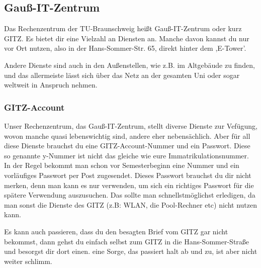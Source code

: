 \subsection{Gauß-IT-Zentrum}

	Das Rechenzentrum der TU-Braunschweig heißt Gauß-IT-Zentrum oder kurz GITZ. Es bietet dir eine Vielzahl an Diensten an. Manche davon kannst du nur vor Ort nutzen, also in der Hans-Sommer-Str. 65, direkt hinter dem ,E-Tower'. 

	Andere Dienste sind auch in den Außenstellen, wie z.B. im
	Altgebäude zu finden, und das allermeiste lässt sich über das Netz an der gesamten Uni oder sogar weltweit in Anspruch nehmen.

\subsubsection{GITZ-Account}
\label{todogitz}
	Unser Rechenzentrum, das Gauß-IT-Zentrum, stellt  diverse
	Dienste zur Vefügung, wovon manche quasi lebenswichtig sind,
	andere eher nebensächlich. Aber für all diese Dienste brauchst du eine GITZ-Account-Nummer und ein Passwort. Diese so genannte y-Nummer ist nicht das gleiche wie eure Immatrikulationsnummer. In der Regel bekommt man schon vor 
	Semesterbeginn eine Nummer und ein vorläufiges Passwort per Post
	zugesendet. Dieses Passwort brauchst du dir nicht merken, denn man kann es nur verwenden, um  sich ein richtiges Passwort für die spätere Verwendung auszusuchen.
	Das sollte man schnellstmöglichst erledigen, da man sonst die
	Dienste des GITZ (z.B: WLAN, die Pool-Rechner etc) nicht nutzen
	kann. 

	Es kann auch passieren, dass du den besagten Brief vom GITZ  gar
	nicht bekommst, dann gehst du einfach selbst zum GITZ in die
	Hans-Sommer-Straße und besorgst dir dort einen. eine Sorge, das passiert halt ab und zu, ist aber nicht weiter schlimm.

